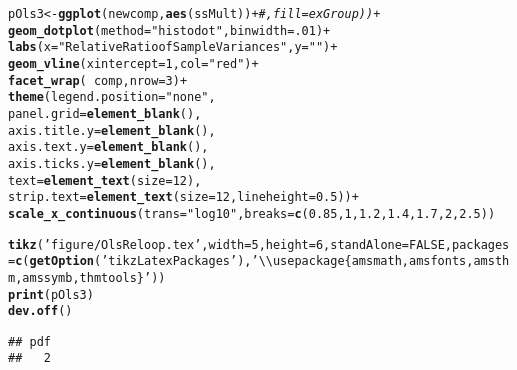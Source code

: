 \documentclass[12pt]{article}\usepackage[]{graphicx}\usepackage[]{xcolor}
\makeatletter
\newcommand{\hlnum}[1]{\textcolor[rgb]{0.686,0.059,0.569}{#1}}%
\newcommand{\hlstr}[1]{\textcolor[rgb]{0.192,0.494,0.8}{#1}}%
\newcommand{\hlcom}[1]{\textcolor[rgb]{0.678,0.584,0.686}{\textit{#1}}}%
\newcommand{\hlopt}[1]{\textcolor[rgb]{0,0,0}{#1}}%
\newcommand{\hlstd}[1]{\textcolor[rgb]{0.345,0.345,0.345}{#1}}%
\newcommand{\hlkwb}[1]{\textcolor[rgb]{0.69,0.353,0.396}{#1}}%
\newcommand{\hlkwc}[1]{\textcolor[rgb]{0.333,0.667,0.333}{#1}}%
\newcommand{\hlkwd}[1]{\textcolor[rgb]{0.737,0.353,0.396}{\textbf{#1}}}%
\newenvironment{kframe}{%
 \def\at@end@of@kframe{}%
 \ifinner\ifhmode%
  \def\at@end@of@kframe{\end{minipage}}%
  \begin{minipage}{\columnwidth}%
 \fi\fi%
 \def\FrameCommand##1{\hskip\@totalleftmargin \hskip-\fboxsep
 \colorbox{shadecolor}{##1}\hskip-\fboxsep
     \hskip-\linewidth \hskip-\@totalleftmargin \hskip\columnwidth}%
 \MakeFramed {\advance\hsize-\width
   \@totalleftmargin\z@ \linewidth\hsize
   \@setminipage}}%
 {\par\unskip\endMakeFramed%
 \at@end@of@kframe}
\newenvironment{knitrout}{}{} %
\makeatother
\begin{document}
\begin{knitrout}
\begin{kframe}
\begin{alltt}
\hlstd{pOls3} \hlkwb{<-} \hlkwd{ggplot}\hlstd{(newcomp,}\hlkwd{aes}\hlstd{(ssMult))}\hlopt{+}\hlcom{#,fill=exGroup))+}
    \hlkwd{geom_dotplot}\hlstd{(} \hlkwc{method}\hlstd{=}\hlstr{"histodot"}\hlstd{,} \hlkwc{binwidth} \hlstd{=} \hlnum{.01} \hlstd{)}  \hlopt{+}
    \hlkwd{labs}\hlstd{(} \hlkwc{x} \hlstd{=} \hlstr{"Relative Ratio of Sample Variances"}\hlstd{,} \hlkwc{y}\hlstd{=}\hlstr{""} \hlstd{)} \hlopt{+}
    \hlkwd{geom_vline}\hlstd{(} \hlkwc{xintercept} \hlstd{=} \hlnum{1}\hlstd{,} \hlkwc{col}\hlstd{=}\hlstr{"red"} \hlstd{)} \hlopt{+}
    \hlkwd{facet_wrap}\hlstd{(}\hlopt{~}\hlstd{comp,}\hlkwc{nrow}\hlstd{=}\hlnum{3}\hlstd{)}\hlopt{+}
    \hlkwd{theme}\hlstd{(}\hlkwc{legend.position} \hlstd{=} \hlstr{"none"}\hlstd{,}
        \hlkwc{panel.grid} \hlstd{=} \hlkwd{element_blank}\hlstd{(),}
        \hlkwc{axis.title.y} \hlstd{=} \hlkwd{element_blank}\hlstd{(),}
        \hlkwc{axis.text.y}\hlstd{=} \hlkwd{element_blank}\hlstd{(),}
        \hlkwc{axis.ticks.y} \hlstd{=} \hlkwd{element_blank}\hlstd{(),}
        \hlkwc{text}\hlstd{=}\hlkwd{element_text}\hlstd{(}\hlkwc{size}\hlstd{=}\hlnum{12}\hlstd{),}
        \hlkwc{strip.text}\hlstd{=}\hlkwd{element_text}\hlstd{(}\hlkwc{size}\hlstd{=}\hlnum{12}\hlstd{,}\hlkwc{lineheight}\hlstd{=}\hlnum{0.5}\hlstd{))}\hlopt{+}
  \hlkwd{scale_x_continuous}\hlstd{(}\hlkwc{trans}\hlstd{=}\hlstr{"log10"}\hlstd{,}\hlkwc{breaks}\hlstd{=}\hlkwd{c}\hlstd{(}\hlnum{0.85}\hlstd{,}\hlnum{1}\hlstd{,}\hlnum{1.2}\hlstd{,}\hlnum{1.4}\hlstd{,}\hlnum{1.7}\hlstd{,}\hlnum{2}\hlstd{,}\hlnum{2.5}\hlstd{))}


\hlkwd{tikz}\hlstd{(}\hlstr{'figure/OlsReloop.tex'}\hlstd{,}\hlkwc{width}\hlstd{=}\hlnum{5}\hlstd{,}\hlkwc{height}\hlstd{=}\hlnum{6}\hlstd{,}\hlkwc{standAlone}\hlstd{=}\hlnum{FALSE}\hlstd{,}\hlkwc{packages}\hlstd{=} \hlkwd{c}\hlstd{(}\hlkwd{getOption}\hlstd{(}\hlstr{'tikzLatexPackages'}\hlstd{),}\hlstr{'\textbackslash{}\textbackslash{}usepackage\{amsmath,amsfonts,amsthm,amssymb,thmtools\}'}\hlstd{))}
\hlkwd{print}\hlstd{(pOls3)}
\hlkwd{dev.off}\hlstd{()}
\end{alltt}
\begin{verbatim}
## pdf 
##   2
\end{verbatim}
\end{kframe}
\end{knitrout}
\end{document}
